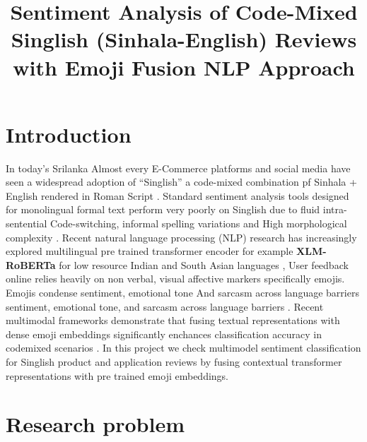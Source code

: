 \documentclass[conference]{IEEEtran}
\begin{document}
\title{Sentiment Analysis of Code-Mixed Singlish (Sinhala-English) Reviews with Emoji Fusion NLP Approach\\
}

\author{
}

\maketitle

\section{Introduction}
In today's Srilanka Almost every E-Commerce platforms and social media have
seen a widespread adoption of ``Singlish'' a code-mixed combination pf Sinhala
+ English rendered in Roman Script \cite{uthpala2024sinhala}. Standard
sentiment analysis tools designed for monolingual formal text perform very
poorly on Singlish due to fluid intra-sentential Code-switching, informal
spelling variations and High morphological complexity
\cite{chakravarthi2020corpus}. Recent natural language processing (NLP)
research has increasingly explored multilingual pre trained transformer encoder
for example \textbf{XLM-RoBERTa} for low resource Indian and South Asian
languages \cite{devlin2019bert,desilva2019survey}, User feedback online relies
heavily on non verbal, visual affective markers specifically emojis. Emojis
condense sentiment, emotional tone And sarcasm across language barriers
sentiment, emotional tone, and sarcasm across language barriers
\cite{barbieri2017are,eisner2016emoji2vec}. Recent multimodal frameworks
demonstrate that fusing textual representations with dense emoji embeddings
significantly enchances classification accuracy in codemixed scenarios
\cite{singh2024predicting}. In this project we check multimodel sentiment
classification for Singlish product and application reviews by fusing
contextual transformer representations with pre trained emoji embeddings.

\section{Research problem}
\end{document}
